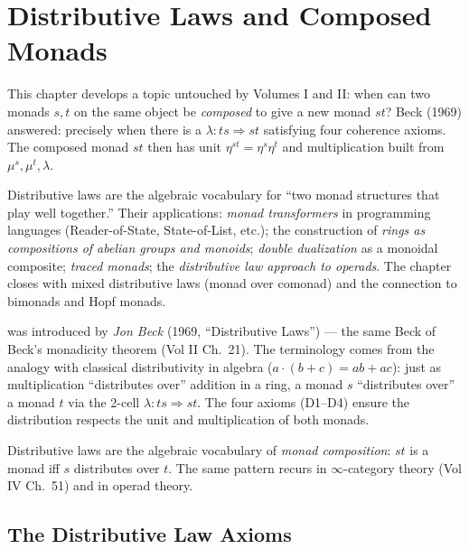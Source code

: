 
\chapter{Distributive Laws and Composed Monads}

\begin{overviewbox}
This chapter develops a topic untouched by Volumes I and II: when can two
monads $s, t$ on the same object be \emph{composed} to give a new monad
$st$? Beck (1969) answered: precisely when there is a  $\lambda : ts \Rightarrow st$ satisfying four coherence axioms. The
composed monad $st$ then has unit $\eta^{st} = \eta^s \eta^t$ and
multiplication built from $\mu^s, \mu^t, \lambda$.

Distributive laws are the algebraic vocabulary for ``two monad structures
that play well together.'' Their applications: \emph{monad transformers}
in programming languages (Reader-of-State, State-of-List, etc.); the
construction of \emph{rings as compositions of abelian groups and monoids};
\emph{double dualization} as a monoidal composite; \emph{traced monads};
the \emph{distributive law approach to operads}. The chapter closes with
mixed distributive laws (monad over comonad) and the connection to bimonads
and Hopf monads.
\end{overviewbox}


\begin{nameorigin}
 was introduced by \emph{Jon Beck} (1969,
``Distributive Laws'') — the same Beck of Beck's monadicity theorem
(Vol II Ch.~21). The terminology comes from the analogy with classical
distributivity in algebra ($a \cdot (b + c) = ab + ac$): just as
multiplication ``distributes over'' addition in a ring, a monad
$s$ ``distributes over'' a monad $t$ via the 2-cell $\lambda : ts
\Rightarrow st$. The four axioms (D1--D4) ensure the distribution
respects the unit and multiplication of both monads.

Distributive laws are the algebraic vocabulary of \emph{monad
composition}: $st$ is a monad iff $s$ distributes over $t$. The same
pattern recurs in $\infty$-category theory (Vol IV Ch.~51) and in
operad theory.
\end{nameorigin}

\section{The Distributive Law Axioms}
\label{sec:dist-axioms}

